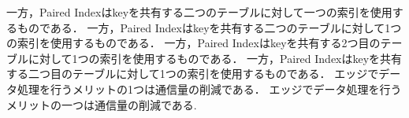 一方，Paired Indexはkeyを共有する二つのテーブルに対して一つの索引を使用するものである．
一方，Paired Indexはkeyを共有する二つのテーブルに対して1つの索引を使用するものである．
一方，Paired Indexはkeyを共有する2つ目のテーブルに対して1つの索引を使用するものである．
一方，Paired Indexはkeyを共有する二つ目のテーブルに対して1つの索引を使用するものである．
エッジでデータ処理を行うメリットの1つは通信量の削減である．
エッジでデータ処理を行うメリットの一つは通信量の削減である.
